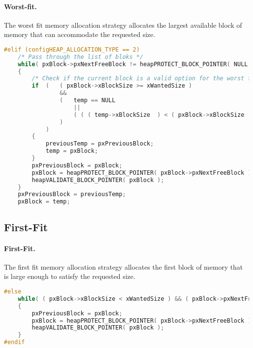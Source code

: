 \paragraph{Worst-fit.} The worst fit memory allocation strategy allocates the largest available block of memory that can accommodate the requested size.
\begin{lstlisting}[language=C,caption={Custom implementation of Worst-Fit algorithm added to heap\_4.c}]
#elif (configHEAP_ALLOCATION_TYPE == 2)
    /* Pass through the list of bloks */
    while( pxBlock->pxNextFreeBlock != heapPROTECT_BLOCK_POINTER( NULL ) )
    {
        /* Check if the current block is a valid option for the worst fit algorithm  */
        if  (   ( pxBlock->xBlockSize >= xWantedSize )
                &&
                (   temp == NULL
                    ||
                    ( ( ( temp->xBlockSize  ) < ( pxBlock->xBlockSize  ) ))
                )
            )
        {
            previousTemp = pxPreviousBlock;
            temp = pxBlock;
        }
        pxPreviousBlock = pxBlock;
        pxBlock = heapPROTECT_BLOCK_POINTER( pxBlock->pxNextFreeBlock );
        heapVALIDATE_BLOCK_POINTER( pxBlock );
    }
    pxPreviousBlock = previousTemp;
    pxBlock = temp;
\end{lstlisting}

\subsection{First-Fit}
\paragraph{First-Fit.}The first fit memory allocation strategy allocates the first block of memory that is large enough to satisfy the requested size.

\begin{lstlisting}[language=C,caption={Default implementation of First-fit algorithm}]
#else
    while( ( pxBlock->xBlockSize < xWantedSize ) && ( pxBlock->pxNextFreeBlock != heapPROTECT_BLOCK_POINTER( NULL ) ) )
    {
        pxPreviousBlock = pxBlock;
        pxBlock = heapPROTECT_BLOCK_POINTER( pxBlock->pxNextFreeBlock );
        heapVALIDATE_BLOCK_POINTER( pxBlock );
    }
#endif
\end{lstlisting}
